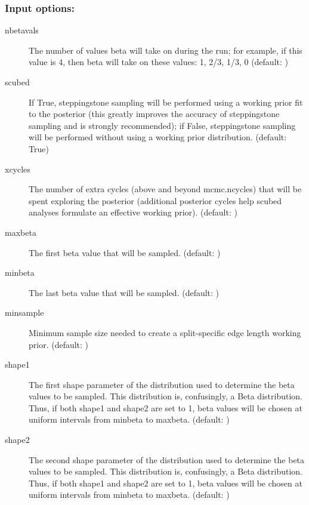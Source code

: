\subsubsection{Input options:}\begin{description}
\item[\bftt  nbetavals] The number of values beta will take on during the run; for example, if this value is 4, then beta will take on these values: 1, 2/3, 1/3, 0 (default: {})
\item[\bftt  scubed] If True, steppingstone sampling will be performed using a working prior fit to the posterior (this greatly improves the accuracy of steppingstone sampling and is strongly recommended); if False, steppingstone sampling will be performed without using a working prior distribution. (default: {\bftt  True})
\item[\bftt  xcycles] The number of extra cycles (above and beyond mcmc.ncycles) that will be spent exploring the posterior (additional posterior cycles help scubed analyses formulate an effective working prior). (default: {})
\item[\bftt  maxbeta] The first beta value that will be sampled. (default: {})
\item[\bftt  minbeta] The last beta value that will be sampled. (default: {})
\item[\bftt  minsample] Minimum sample size needed to create a split-specific edge length working prior. (default: {})
\item[\bftt  shape1] The first shape parameter of the distribution used to determine the beta values to be sampled. This distribution is, confusingly, a Beta distribution. Thus, if both shape1 and shape2 are set to 1, beta values will be chosen at uniform intervals from minbeta to maxbeta. (default: {})
\item[\bftt  shape2] The second shape parameter of the distribution used to determine the beta values to be sampled. This distribution is, confusingly, a Beta distribution. Thus, if both shape1 and shape2 are set to 1, beta values will be chosen at uniform intervals from minbeta to maxbeta. (default: {})
\end{description}

